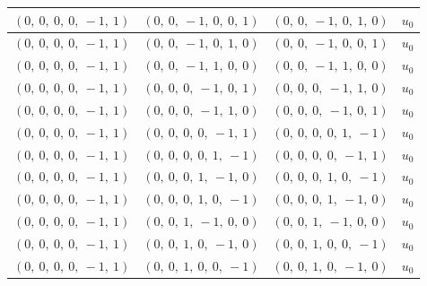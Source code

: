 \documentclass[11pt]{article}
\theoremstyle{definition}
\begin{document}
\begin{longtable}{|l|l|l|c|}
    \hline
    $\left( 0, \  0, \  0, \  0, \  -1, \  1\right)$ & $\left( 0, \  0, \  -1, \  0, \  0, \  1\right)$ & $\left( 0, \  0, \  -1, \  0, \  1, \  0\right)$ & $u_{0}$ \\
    \hline
    $\left( 0, \  0, \  0, \  0, \  -1, \  1\right)$ & $\left( 0, \  0, \  -1, \  0, \  1, \  0\right)$ & $\left( 0, \  0, \  -1, \  0, \  0, \  1\right)$ & $u_{0}$ \\
    \hline
    $\left( 0, \  0, \  0, \  0, \  -1, \  1\right)$ & $\left( 0, \  0, \  -1, \  1, \  0, \  0\right)$ & $\left( 0, \  0, \  -1, \  1, \  0, \  0\right)$ & $u_{0}$ \\
    \hline
    $\left( 0, \  0, \  0, \  0, \  -1, \  1\right)$ & $\left( 0, \  0, \  0, \  -1, \  0, \  1\right)$ & $\left( 0, \  0, \  0, \  -1, \  1, \  0\right)$ & $u_{0}$ \\
    \hline
    $\left( 0, \  0, \  0, \  0, \  -1, \  1\right)$ & $\left( 0, \  0, \  0, \  -1, \  1, \  0\right)$ & $\left( 0, \  0, \  0, \  -1, \  0, \  1\right)$ & $u_{0}$ \\
    \hline
    $\left( 0, \  0, \  0, \  0, \  -1, \  1\right)$ & $\left( 0, \  0, \  0, \  0, \  -1, \  1\right)$ & $\left( 0, \  0, \  0, \  0, \  1, \  -1\right)$ & $u_{0}$ \\
    \hline
    $\left( 0, \  0, \  0, \  0, \  -1, \  1\right)$ & $\left( 0, \  0, \  0, \  0, \  1, \  -1\right)$ & $\left( 0, \  0, \  0, \  0, \  -1, \  1\right)$ & $u_{0}$ \\
    \hline
    $\left( 0, \  0, \  0, \  0, \  -1, \  1\right)$ & $\left( 0, \  0, \  0, \  1, \  -1, \  0\right)$ & $\left( 0, \  0, \  0, \  1, \  0, \  -1\right)$ & $u_{0}$ \\
    \hline
    $\left( 0, \  0, \  0, \  0, \  -1, \  1\right)$ & $\left( 0, \  0, \  0, \  1, \  0, \  -1\right)$ & $\left( 0, \  0, \  0, \  1, \  -1, \  0\right)$ & $u_{0}$ \\
    \hline
    $\left( 0, \  0, \  0, \  0, \  -1, \  1\right)$ & $\left( 0, \  0, \  1, \  -1, \  0, \  0\right)$ & $\left( 0, \  0, \  1, \  -1, \  0, \  0\right)$ & $u_{0}$ \\
    \hline
    $\left( 0, \  0, \  0, \  0, \  -1, \  1\right)$ & $\left( 0, \  0, \  1, \  0, \  -1, \  0\right)$ & $\left( 0, \  0, \  1, \  0, \  0, \  -1\right)$ & $u_{0}$ \\
    \hline
    $\left( 0, \  0, \  0, \  0, \  -1, \  1\right)$ & $\left( 0, \  0, \  1, \  0, \  0, \  -1\right)$ & $\left( 0, \  0, \  1, \  0, \  -1, \  0\right)$ & $u_{0}$ \\

\end{longtable}
\end{document}

